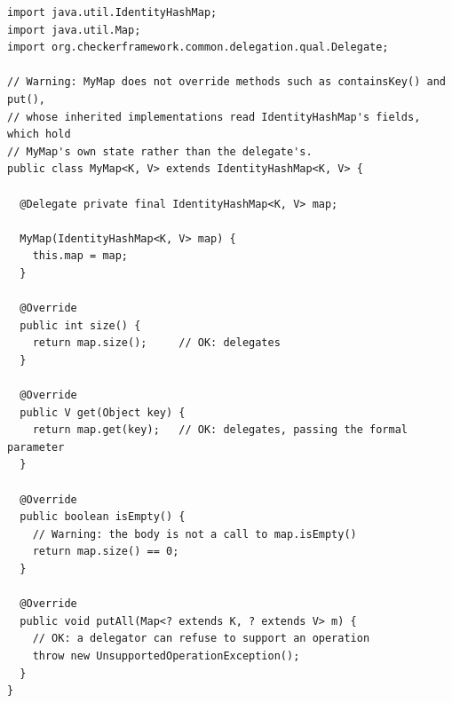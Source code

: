 \begin{Verbatim}
import java.util.IdentityHashMap;
import java.util.Map;
import org.checkerframework.common.delegation.qual.Delegate;

// Warning: MyMap does not override methods such as containsKey() and put(),
// whose inherited implementations read IdentityHashMap's fields, which hold
// MyMap's own state rather than the delegate's.
public class MyMap<K, V> extends IdentityHashMap<K, V> {

  @Delegate private final IdentityHashMap<K, V> map;

  MyMap(IdentityHashMap<K, V> map) {
    this.map = map;
  }

  @Override
  public int size() {
    return map.size();     // OK: delegates
  }

  @Override
  public V get(Object key) {
    return map.get(key);   // OK: delegates, passing the formal parameter
  }

  @Override
  public boolean isEmpty() {
    // Warning: the body is not a call to map.isEmpty()
    return map.size() == 0;
  }

  @Override
  public void putAll(Map<? extends K, ? extends V> m) {
    // OK: a delegator can refuse to support an operation
    throw new UnsupportedOperationException();
  }
}
\end{Verbatim}


